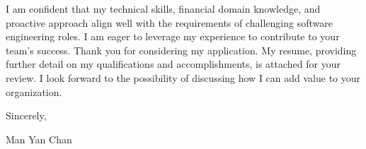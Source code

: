\documentclass[11pt, a4paper]{article}
\begin{document}
I am confident that my technical skills, financial domain knowledge, and proactive approach align well with the requirements of challenging software engineering roles. I am eager to leverage my experience to contribute to your team's success. Thank you for considering my application. My resume, providing further detail on my qualifications and accomplishments, is attached for your review. I look forward to the possibility of discussing how I can add value to your organization.

\medskip %
\noindent Sincerely,

\vspace{3\baselineskip} %

\noindent Man Yan Chan

\end{document}
